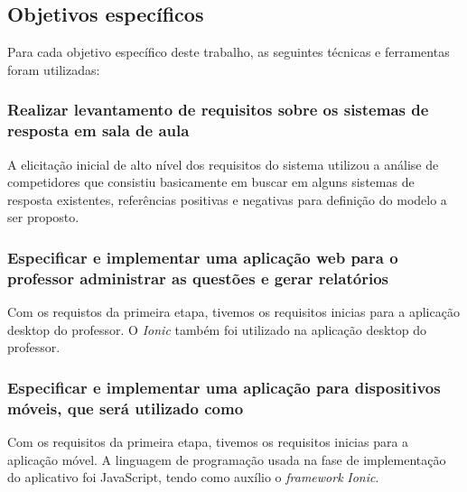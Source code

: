 %

\subsection{Objetivos específicos}

Para cada objetivo específico deste trabalho, as seguintes técnicas e ferramentas foram utilizadas:

\subsubsection{Realizar levantamento de requisitos sobre os sistemas de resposta em sala de aula}

A elicitação inicial de alto nível dos requisitos do sistema utilizou a análise de competidores que
consistiu basicamente em buscar em alguns sistemas de resposta existentes, referências positivas e
negativas para definição do modelo a ser proposto.

\subsubsection{Especificar e implementar uma aplicação web para o professor administrar as questões e gerar relatórios}

Com os requistos da primeira etapa, tivemos os requisitos inicias para a aplicação desktop do professor.
O \textit{Ionic} também foi utilizado na aplicação desktop do professor.

\subsubsection{Especificar e implementar uma aplicação para dispositivos móveis, que será utilizado como {\clickers}}

Com os requisitos da primeira etapa, tivemos os requisitos inicias para a aplicação móvel.
A linguagem de programação usada na fase de implementação do aplicativo foi JavaScript, tendo como auxílio o \textit{framework} \textit{Ionic}.

